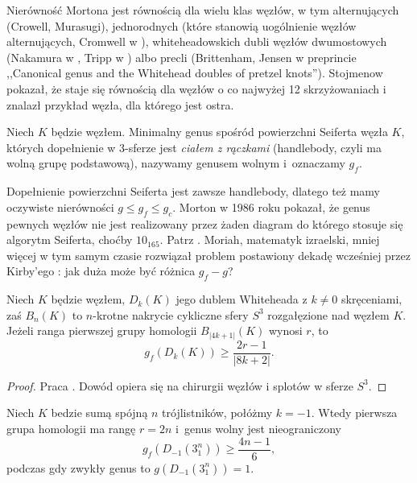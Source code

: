 Nierówność Mortona jest równością dla wielu klas węzłów, w tym alternujących (Crowell, Murasugi), jednorodnych (które stanowią uogólnienie węzłów alternujących, Cromwell w \cite{cromwell89}), whiteheadowskich dubli węzłów dwumostowych (Nakamura w \cite{nakamura06}, Tripp w \cite{tripp02}) albo precli (Brittenham, Jensen w preprincie ,,Canonical genus and the Whitehead doubles of pretzel knots'').
Stojmenow pokazał, że staje się równością dla węzłów o co najwyżej 12 skrzyżowaniach i znalazł przykład węzła, dla którego jest ostra.

\begin{definition}
    Niech $K$ będzie węzłem.
    Minimalny genus spośród powierzchni Seiferta węzła $K$, których dopełnienie w 3-sferze jest \emph{ciałem z rączkami} (handlebody, czyli ma wolną grupę podstawową), nazywamy genusem wolnym i~oznaczamy $g_f$.
\end{definition}

Dopełnienie powierzchni Seiferta jest zawsze handlebody, dlatego też mamy oczywiste nierówności $g \le g_f \le g_c$.
Morton w 1986 roku pokazał, że genus pewnych węzłów nie jest realizowany przez żaden diagram do którego stosuje się algorytm Seiferta, choćby $10_{165}$.
Patrz \cite{morton86}.
Moriah, matematyk izraelski, mniej więcej w tym samym czasie rozwiązał problem postawiony dekadę wcześniej przez Kirby'ego \cite{kirby78}: jak duża może być różnica $g_f - g$?

\begin{proposition}
    Niech $K$ będzie węzłem, $D_k(K)$ jego dublem Whiteheada z $k \neq 0$ skręceniami, zaś $B_n(K)$ to $n$-krotne nakrycie cykliczne sfery $S^3$ rozgałęzione nad węzłem $K$.
    Jeżeli ranga pierwszej grupy homologii $B_{|4k+1|}(K)$ wynosi $r$, to
    \begin{equation}
        g_f(D_k(K)) \ge \frac {2r-1} {|8k+2|}.
    \end{equation}
\end{proposition}

\begin{proof}
    Praca \cite{moriah87}.
    Dowód opiera się na chirurgii węzłów i splotów w sferze $S^3$.
\end{proof}

\begin{corollary}
    Niech $K$ bedzie sumą spójną $n$ trójlistników, połóżmy $k = -1$.
    Wtedy pierwsza grupa homologii ma rangę $r = 2n$ i~genus wolny jest nieograniczony
    \begin{equation}
        g_f(D_{-1}(3_1^n)) \ge \frac {4n-1} {6},
    \end{equation}
    podczas gdy zwykły genus to $g(D_{-1}(3_1^n)) = 1$.
\end{corollary}

